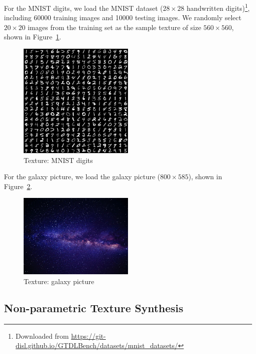 \documentclass{article}
\begin{document}
For the MNIST digits, we load the MNIST dataset ($28 \times 28$ handwritten digits)\footnote{Downloaded from \url{https://git-disl.github.io/GTDLBench/datasets/mnist_datasets/}}, including 60000 training images and 10000 testing images. 
We randomly select $20 \times 20$ images from the training set as the sample texture of size $560 \times 560$, shown in Figure~\ref{fig:texture-mnist}.

\begin{figure}[htbp!]
    \centering
    \includegraphics[width=0.5\textwidth]{../Code/Textures/mnist.png}
    \caption{Texture: MNIST digits}
    \label{fig:texture-mnist}
\end{figure}

For the galaxy picture, we load the galaxy picture ($800 \times 585$), shown in Figure~\ref{fig:texture-galaxy}.
\begin{figure}[htbp!]
    \centering
    \includegraphics[width=0.5\textwidth]{../Code/Textures/galaxy.png}
    \caption{Texture: galaxy picture}
    \label{fig:texture-galaxy}
\end{figure}

\subsection{Non-parametric Texture Synthesis}
\end{document}
